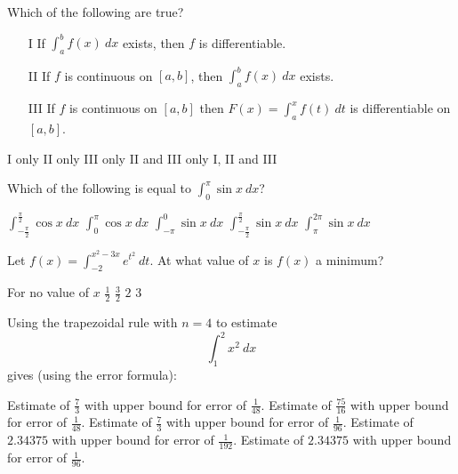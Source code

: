 \begin{questions}
\question[2] Which of the following are true?
    \begin{enumerate}
    \item[I]   If $\int_a^b f(x)\ dx$ exists, then $f$ is differentiable.
    \item[II]  If $f$ is continuous on $[a, b]$, then $\int_a^b f(x)\
    dx$ exists. 
    \item[III] If $f$ is continuous on $[a, b]$ then $F(x) = \int_a^x
    f(t)\ dt$ is differentiable on $[a, b]$.
    \end{enumerate}

    \begin{oneparchoices}
    \choice I only
    \choice II only
    \choice III only
    \choice II and III only
    \CorrectChoice I, II and III
    \end{oneparchoices}

\question[2] Which of the following is equal to $\int_0^\pi \sin x\ dx$?

    \begin{oneparchoices}
    \choice $\int_{-\frac{\pi}{2}}^\frac{\pi}{2} \cos x\ dx$
    \CorrectChoice $\int_0^\pi \cos x\ dx$
    \choice $\int_{-\pi}^0 \sin x\ dx$
    \choice $\int_{-\frac{\pi}{2}}^\frac{\pi}{2} \sin x\ dx$
    \choice $\int_\pi^{2\pi} \sin x\ dx$
    \end{oneparchoices}

\question[2] Let $f(x) = \int_{-2}^{x^2 - 3x} e^{t^2}\ dt.$ At what
    value of $x$ is $f(x)$ a minimum?

    \begin{oneparchoices}
    \choice For no value of $x$
    \choice $\frac{1}{2}$
    \CorrectChoice $\frac{3}{2}$
    \choice $2$
    \choice $3$
    \end{oneparchoices}

\question[2] Using the trapezoidal rule with $n = 4$ to estimate
             $$\int_1^2 x^2\ dx$$ gives (using the error formula):

    \begin{oneparchoices}
    \choice Estimate of $\frac{7}{3}$ with upper bound for error of $\frac{1}{48}$.
    \choice Estimate of $\frac{75}{16}$ with upper bound for error of $\frac{1}{48}$.
    \choice Estimate of $\frac{7}{3}$ with upper bound for error of $\frac{1}{96}$.
    \choice Estimate of $2.34375$ with upper bound for error of $\frac{1}{192}$.
    \CorrectChoice Estimate of $2.34375$ with upper bound for error of $\frac{1}{96}$.
    \end{oneparchoices}


\end{questions}
